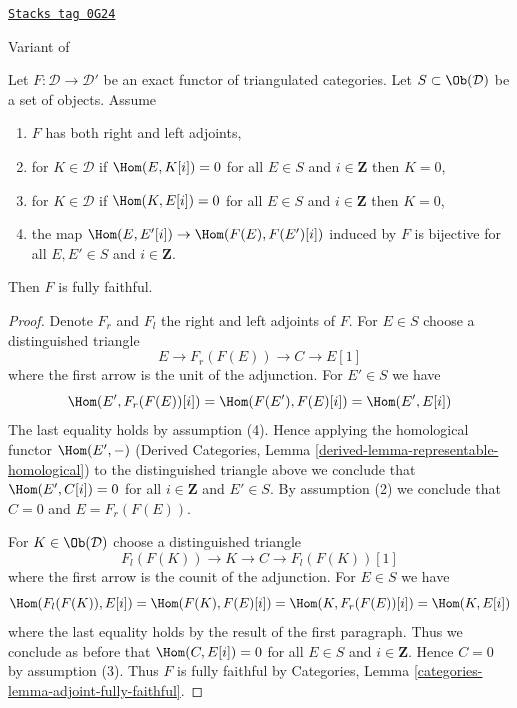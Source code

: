 \begin{lemma}
\label{equiv-lemma-get-fully-faithful}
\href{https://stacks.math.columbia.edu/tag/0G24}{\texttt{Stacks tag 0G24}}

\begin{reference}
Variant of \cite[Lemma 2.15]{Orlov-K3}
\end{reference}
Let $F : \mathcal{D} \to \mathcal{D}'$ be an exact functor of
triangulated categories. Let $S \subset \Ob(\mathcal{D})$ be
a set of objects. Assume
\begin{enumerate}
\item $F$ has both right and left adjoints,
\item for $K \in \mathcal{D}$ if $\Hom(E, K[i]) = 0$ for all
$E \in S$ and $i \in \mathbf{Z}$ then $K = 0$,
\item for $K \in \mathcal{D}$ if $\Hom(K, E[i]) = 0$ for all
$E \in S$ and $i \in \mathbf{Z}$ then $K = 0$,
\item the map $\Hom(E, E'[i]) \to \Hom(F(E), F(E')[i])$ induced by $F$
is bijective for all $E, E' \in S$ and $i \in \mathbf{Z}$.
\end{enumerate}
Then $F$ is fully faithful.
\end{lemma}

\begin{proof}
Denote $F_r$ and $F_l$ the right and left adjoints of $F$. For
$E \in S$ choose a distinguished triangle
$$
E \to F_r(F(E)) \to C \to E[1]
$$
where the first arrow is the unit of the adjunction. For $E' \in S$ we have
$$
\Hom(E', F_r(F(E))[i]) = \Hom(F(E'), F(E)[i]) = \Hom(E', E[i])
$$
The last equality holds by assumption (4).
Hence applying the homological functor $\Hom(E', -)$
(Derived Categories, Lemma \ref{derived-lemma-representable-homological})
to the distinguished triangle above we conclude that $\Hom(E', C[i]) = 0$
for all $i \in \mathbf{Z}$ and $E' \in S$. By assumption (2) we conclude
that $C = 0$ and $E = F_r(F(E))$.

\medskip\noindent
For $K \in \Ob(\mathcal{D})$ choose a distinguished triangle
$$
F_l(F(K)) \to K \to C \to F_l(F(K))[1]
$$
where the first arrow is the counit of the adjunction. For $E \in S$
we have
$$
\Hom(F_l(F(K)), E[i]) = \Hom(F(K), F(E)[i]) =
\Hom(K, F_r(F(E))[i]) = \Hom(K, E[i])
$$
where the last equality holds by the result of the first paragraph.
Thus we conclude as before that $\Hom(C, E[i]) = 0$ for all $E \in S$
and $i \in \mathbf{Z}$. Hence $C = 0$ by assumption (3).
Thus $F$ is fully faithful by Categories, Lemma
\ref{categories-lemma-adjoint-fully-faithful}.
\end{proof}

